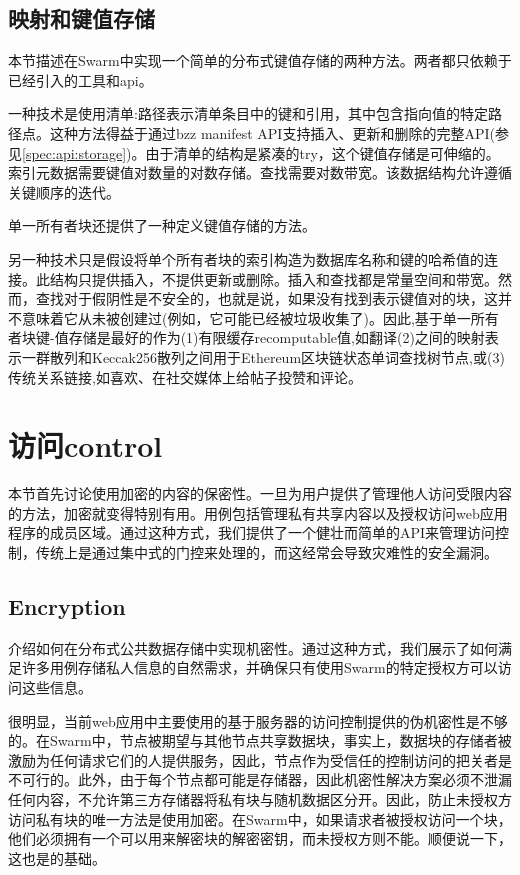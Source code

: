 \subsection{映射和键值存储\statusgreen}\label{sec:maps}

本节描述在Swarm中实现一个简单的分布式键值存储的两种方法。两者都只依赖于已经引入的工具和api。

一种技术是使用清单:路径表示清单条目中的键和引用，其中包含指向值的特定路径点。这种方法得益于通过bzz manifest API支持插入、更新和删除的完整API(参见\ref{spec:api:storage})。由于清单的结构是紧凑的try，这个键值存储是可伸缩的。索引元数据需要键值对数量的对数存储。查找需要对数带宽。该数据结构允许遵循关键顺序的迭代。

单一所有者块还提供了一种定义键值存储的方法。

另一种技术只是假设将单个所有者块的索引构造为数据库名称和键的哈希值的连接。此结构只提供插入，不提供更新或删除。插入和查找都是常量空间和带宽。然而，查找对于假阴性是不安全的，也就是说，如果没有找到表示键值对的块，这并不意味着它从未被创建过(例如，它可能已经被垃圾收集了)。因此,基于单一所有者块键-值存储是最好的作为(1)有限缓存recomputable值,如翻译(2)之间的映射表示一群散列和Keccak256散列之间用于Ethereum区块链状态单词查找树节点,或(3)传统关系链接,如喜欢、在社交媒体上给帖子投赞和评论。 


\section{访问control\statusgreen}\label{sec:access-control}

\green{}

本节首先讨论使用加密的内容的保密性。一旦为用户提供了管理他人访问受限内容的方法，加密就变得特别有用。用例包括管理私有共享内容以及授权访问web应用程序的成员区域。通过这种方式，我们提供了一个健壮而简单的API来管理访问控制，传统上是通过集中式的门控来处理的，而这经常会导致灾难性的安全漏洞。

\subsection{Encryption\statusgreen}\label{sec:encryption}

介绍如何在分布式公共数据存储中实现机密性。通过这种方式，我们展示了如何满足许多用例存储私人信息的自然需求，并确保只有使用Swarm的特定授权方可以访问这些信息。

很明显，当前web应用中主要使用的基于服务器的访问控制提供的伪机密性是不够的。在Swarm中，节点被期望与其他节点共享数据块，事实上，数据块的存储者被激励为任何请求它们的人提供服务，因此，节点作为受信任的控制访问的把关者是不可行的。此外，由于每个节点都可能是存储器，因此机密性解决方案必须不泄漏任何内容，不允许第三方存储器将私有块与随机数据区分开。因此，防止未授权方访问私有块的唯一方法是使用加密。在Swarm中，如果请求者被授权访问一个块，他们必须拥有一个可以用来解密块的解密密钥，而未授权方则不能。顺便说一下，这也是的基础。


